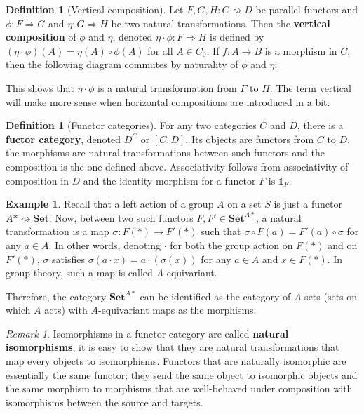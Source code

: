 \documentclass{article}
\theoremstyle{definition}
\newtheorem{defn}[thm]{Definition}
\newtheorem{exmp}[thm]{Example}
\theoremstyle{remark}
\newtheorem{rem}[thm]{Remark}
\newcommand{\one}{\mathbb{1}}
\begin{document}
\begin{defn}[Vertical composition]
	Let $F,G,H: C\rightsquigarrow D$ be parallel functors and $\phi:F\Rightarrow G$ and $\eta:G\Rightarrow H$ be two natural transformations. Then the \textbf{vertical composition} of $\phi$ and $\eta$, denoted $\eta\cdot \phi:F\Rightarrow H$ is defined by $(\eta \cdot \phi)(A) = \eta(A) \circ \phi(A)$ for all $A \in C_0$. If $f: A\rightarrow B$ is a morphism in $C$, then the following diagram commutes by naturality of $\phi$ and $\eta$:
	\begin{figure}[h]
		\centering
	\end{figure}
	
	This shows that $\eta \cdot \phi$ is a natural transformation from $F$ to $H$. The term vertical will make more sense when horizontal compositions are introduced in a bit.
\end{defn}
\begin{defn}[Functor categories]
	For any two categories $C$ and $D$, there is a \textbf{fuctor category}, denoted $D^{C}$ or $[C,D]$. Its objects are functors from $C$ to $D$, the morphisms are natural transformations between such functors and the composition is the one defined above. Associativity follows from associativity of composition in $D$ and the identity morphism for a functor $F$ is $\one_F$.
\end{defn}
\begin{exmp}
	Recall that a left action of a group $A$ on a set $S$ is just a functor $A\ast \rightsquigarrow \textbf{Set}$. Now, between two such functors $F,F' \in \textbf{Set}^{A\ast}$, a natural transformation is a map $\sigma: F(\ast) \rightarrow F'(\ast)$ such that $\sigma \circ F(a) = F'(a) \circ \sigma$ for any $a \in A$. In other words, denoting $\cdot$ for both the group action on $F(\ast)$ and on $F'(\ast)$, $\sigma$ satisfies $\sigma(a\cdot x) = a\cdot(\sigma(x))$ for any $a \in A$ and $x \in F(\ast)$. In group theory, such a map is called $A$-equivariant.
	
	Therefore, the category $\textbf{Set}^{A\ast}$ can be identified as the category of $A$-sets (sets on which $A$ acts) with $A$-equivariant maps as the morphisms.
\end{exmp}
\begin{rem}
	Isomorphisms in a functor category are called \textbf{natural isomorphisms}, it is easy to show that they are natural transformations that map every objects to isomorphisms. Functors that are naturally isomorphic are essentially the same functor; they send the same object to isomorphic objects and the same morphism to morphisms that are well-behaved under composition with isomorphisms between the source and targets.
\end{rem}
\end{document}

